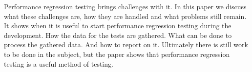Performance regression testing brings challenges with it. In this paper we discuss what these challenges are, how they are handled and what problems still remain. It shows when it is useful to start performance regression testing during the development. How the data for the tests are gathered. What can be done to process the gathered data. And how to report on it. Ultimately there is still work to be done in the subject, but the paper shows that performance regression testing is a useful method of testing.
